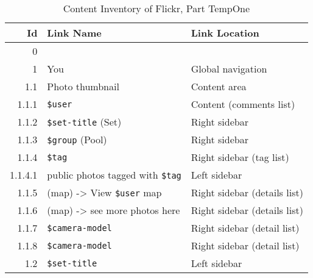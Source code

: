 \documentclass[12pt,a4paper]{article}
\newcommand{\var}[1]{\texttt{\${#1}}}
\begin{document}
\begin{table}[h!b!p!]
  \caption{Content Inventory of Flickr, Part TempOne}
  \label{table:flickr.content.inventory.tmp1}
  \begin{center}
    \begin{small}
      \begin{tabular}{|r|l|l|}
        \hline
        Id &
        Link Name &
        Link Location \\

        \hline

        0 &
        &
        \\

        1 &
        You &
        Global navigation \\

          1.1 &
          Photo thumbnail &
          Content area \\

            1.1.1 &
            \var{user} &
            Content (comments list) \\

            1.1.2 &
            \var{set-title} (Set) &
            Right sidebar \\

            1.1.3 &
            \var{group} (Pool) &
            Right sidebar \\

            1.1.4 &
            \var{tag} &
            Right sidebar (tag list) \\

              1.1.4.1 &
              public photos tagged with \var{tag} &
              Left sidebar \\

                1.1.5 &
                (map) -> View \var{user} map &
                Right sidebar (details list) \\

                1.1.6 &
                (map) -> see more photos here &
                Right sidebar (details list) \\

                1.1.7 &
                \var{camera-model} &
                Right sidebar (detail list) \\

                1.1.8 &
                \var{camera-model} &
                Right sidebar (detail list) \\

              1.2 &
              \var{set-title} &
              Left sidebar \\


\end{tabular}
\end{small}
\end{center}
\end{table}
\end{document}
